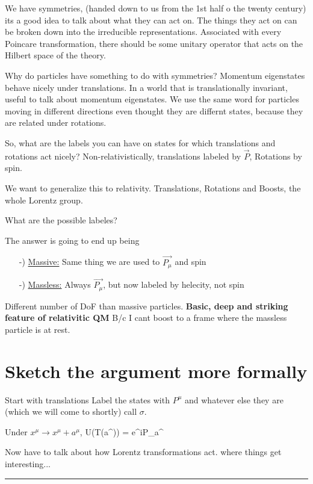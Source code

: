 {We have symmetries, (handed down to us from the 1st half o the twenty century) its a good idea to talk about what they can act on.
The things they act on can be broken down into the irreducible representations.
Associated with every Poincare transformation, there should be some unitary operator that acts on the Hilbert space of the theory.


Why do particles have something to do with symmetries?
Momentum eigenstates behave nicely under translations. 
In a world that is translationally invariant, useful to talk about momentum eigenstates. 
We use the same word for particles moving in different directions even thought they are differnt states, because they are related under rotations. 

So, what are the labels you can have on states for which translations and rotations act nicely?
Non-relativistically, translations labeled by $\vec{P}$, Rotations by spin. 

We want to generalize this to relativity. 
Translations, Rotations and Boosts, the whole Lorentz group.

What are the possible labeles?

The answer is going to end up being
\begin{itemize}
\item[-)] \underline{Massive:} Same thing we are used to $\vec{P_\mu}$ and spin
\item[-)] \underline{Massless:} Always $\vec{P_\mu}$, but now labeled by helecity, not spin
\end{itemize}

Different number of DoF than massive particles.  
\textbf{Basic, deep and striking feature of relativitic QM}
B/c I cant boost to a frame where the massless particle is at rest.

\section*{Sketch the argument more formally}

Start with translations
\be
{}
\ee
Label the states with $P^\mu$ and whatever else they are (which we will come to shortly) call $\sigma$.

Under $x^\mu\rightarrow x^\mu + a^\mu$,
\be
U(T(a^\mu))  = e^{iP_\mu a^\mu}
\ee

Now have to talk about how Lorentz transformations act. 
where things get interesting...

\noindent\rule{\textwidth}{1pt}

}
